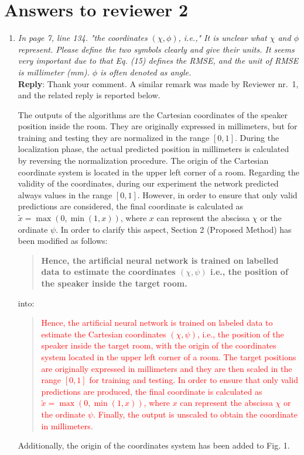 \documentclass[11pt, technote, letterpaper, oneside, onecolumn]{IEEEtran}
\begin{document}
\section{Answers to reviewer 2}\label{sec:rev2}
\begin{enumerate}
\item \textit{In page 7, line 134. "the coordinates $(\chi,\phi)$, i.e.," It is unclear what $\chi$ and $\phi$ represent. Please define the two symbols clearly and give their units. It seems very important due to that Eq. (15) defines the RMSE, and the unit of RMSE is millimeter (mm). $\phi$ is often denoted as angle.\\}
\textbf{Reply}: Thank your comment. A similar remark was made by Reviewer nr.\ 1, and the related reply is reported below.

 The outputs of the algorithms are the Cartesian coordinates of the speaker position inside the room. They are originally expressed in millimeters, but for training and testing they are normalized in the range $[0,1]$. During the localization phase, the actual predicted position in millimeters is calculated by reversing the normalization procedure. The origin of the Cartesian coordinate system is located in the upper left corner of a room. Regarding the validity of the coordinates, during our experiment the network predicted always values in the range $[0,1]$. However, in order to ensure that only valid predictions are considered, the final coordinate is calculated as $\tilde{x} =\max(0, \min(1, x))$, where $x$ can represent the abscissa $\chi$ or the ordinate $\psi$.  In order to clarify this aspect, Section 2 (Proposed Method) has been modified as follows:
\begin{quote}
	\textbf{Hence, the artificial neural network is trained on labelled data to estimate the coordinates $(\chi,\psi)$ i.e., the position of the speaker inside the target room.}
\end{quote}
into:
\begin{quote}
	\textcolor{red}{Hence, the artificial neural network is trained on labeled data to estimate the Cartesian coordinates $\left ( \chi,\psi \right )$, i.e., the position of the speaker inside the target room, with the origin of the coordinates system located in the upper left corner of a room. The target positions are originally expressed in millimeters and they are then scaled in the range $[0,1]$ for training and testing. In order to ensure that only valid predictions are produced, the final coordinate is calculated as $\tilde{x} =\max(0, \min(1, x))$, where $x$ can represent the abscissa $\chi$ or the ordinate $\psi$. Finally, the output is unscaled to obtain the coordinate in millimeters.}
\end{quote}
Additionally, the origin of the coordinates system has been added to Fig. 1.


\end{enumerate}
\end{document}
